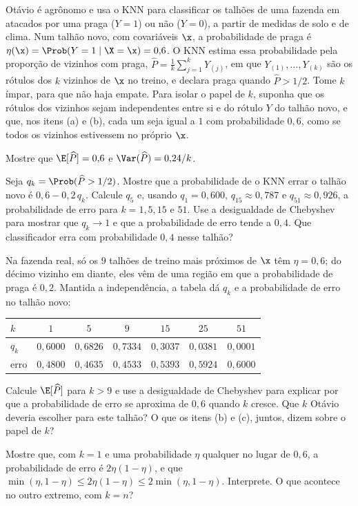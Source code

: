 Otávio é agrônomo e usa o KNN para classificar os talhões de uma fazenda em atacados por uma
praga ($Y=1$) ou não ($Y=0$), a partir de medidas de solo e de clima. Num talhão novo, com
covariáveis $\x$, a probabilidade de praga é $\eta(\x)=\Prob(Y=1\mid\X=\x)=0{,}6$. O KNN
estima essa probabilidade pela proporção de vizinhos com praga,
$\widehat P=\frac1k\sum_{j=1}^kY_{(j)}$, em que $Y_{(1)},\dots,Y_{(k)}$ são os rótulos dos $k$
vizinhos de $\x$ no treino, e declara praga quando $\widehat P>1/2$. Tome $k$ ímpar, para que
não haja empate. Para isolar o papel de $k$, suponha que os rótulos dos vizinhos sejam
independentes entre si e do rótulo $Y$ do talhão novo, e que, nos itens (a) e (b), cada um
seja igual a $1$ com probabilidade $0{,}6$, como se todos os vizinhos estivessem no próprio
$\x$.
\begin{itens}
  \item {} Mostre que $\E[\widehat P]=0{,}6$ e $\Var(\widehat P)=0{,}24/k$.
  \item {} Seja $q_k=\Prob(\widehat P>1/2)$. Mostre que a probabilidade de o KNN errar
        o talhão novo é $0{,}6-0{,}2\,q_k$. Calcule $q_5$ e, usando $q_1=0{,}600$,
        $q_{15}\approx0{,}787$ e $q_{51}\approx0{,}926$, a probabilidade de erro para
        $k=1,5,15$ e $51$. Use a desigualdade de Chebyshev para mostrar que $q_k\to1$ e que a
        probabilidade de erro tende a $0{,}4$. Que classificador erra com probabilidade
        $0{,}4$ nesse talhão?
  \item {} Na fazenda real, só os $9$ talhões de treino mais próximos de $\x$ têm
        $\eta=0{,}6$; do décimo vizinho em diante, eles vêm de uma região em que a
        probabilidade de praga é $0{,}2$. Mantida a independência, a tabela dá $q_k$ e a
        probabilidade de erro no talhão novo:
        \begin{center}\small
        \renewcommand{\arraystretch}{1.2}
        \begin{tabular}{@{}lcccccc@{}}
        \toprule
        $k$ & $1$ & $5$ & $9$ & $15$ & $25$ & $51$ \\
        \midrule
        $q_k$ & $0{,}6000$ & $0{,}6826$ & $0{,}7334$ & $0{,}3037$ & $0{,}0381$ & $0{,}0001$ \\
        erro & $0{,}4800$ & $0{,}4635$ & $0{,}4533$ & $0{,}5393$ & $0{,}5924$ & $0{,}6000$ \\
        \bottomrule
        \end{tabular}
        \end{center}
        Calcule $\E[\widehat P]$ para $k>9$ e use a desigualdade de Chebyshev para explicar
        por que a probabilidade de erro se aproxima de $0{,}6$ quando $k$ cresce. Que $k$
        Otávio deveria escolher para este talhão? O que os itens (b) e (c), juntos, dizem
        sobre o papel de $k$?
  \item {} Mostre que, com $k=1$ e uma probabilidade $\eta$ qualquer no lugar de
        $0{,}6$, a probabilidade de erro é $2\eta(1-\eta)$, e que
        $\min(\eta,1-\eta)\le2\eta(1-\eta)\le2\min(\eta,1-\eta)$. Interprete. O que acontece
        no outro extremo, com $k=n$?
\end{itens}

